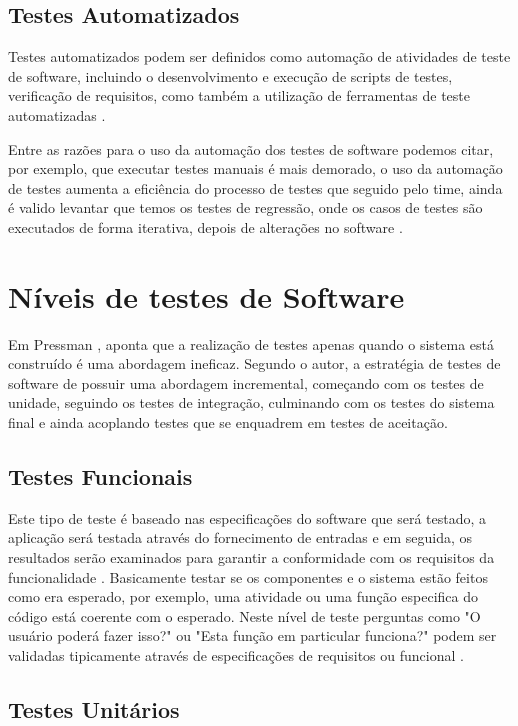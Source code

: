 \subsection{Testes Automatizados}

Testes automatizados podem ser definidos como automação de atividades de teste de software, incluindo o desenvolvimento e execução de scripts de testes, verificação de requisitos, como também a utilização de ferramentas de teste automatizadas \cite{Dustin1999}.
 
Entre as razões para o uso da automação dos testes de software podemos citar, por exemplo, que executar testes manuais é mais demorado, o uso da automação de testes aumenta a  eficiência do processo de testes que seguido pelo time, ainda é valido levantar que temos os testes de regressão, onde os casos de testes são executados de forma iterativa, depois de alterações no software \cite{Dustin1999}.
		
\section{Níveis de testes de Software}

Em Pressman  \cite{Pressman2002}, aponta que a realização de testes apenas quando o sistema está construído é uma abordagem ineficaz. Segundo o autor, a estratégia de testes de software de possuir uma abordagem incremental, começando com os testes de unidade, seguindo os testes de integração, culminando com os testes do sistema final e ainda acoplando testes que se enquadrem em testes de aceitação.

\subsection{Testes Funcionais}

Este tipo de teste é baseado nas especificações do software que será testado, a aplicação será testada através do fornecimento de entradas e em seguida, os resultados serão examinados para garantir a conformidade com os requisitos da funcionalidade \cite{tutorialsPoint}. Basicamente testar se os componentes e o sistema estão feitos como era esperado, por exemplo, uma atividade ou uma função especifica do código está coerente com o esperado. Neste nível de teste perguntas como "O usuário poderá fazer isso?" ou "Esta função em particular funciona?" podem ser validadas tipicamente através de especificações de requisitos ou funcional \cite{Leung1990}. 

\subsection{Testes Unitários}

